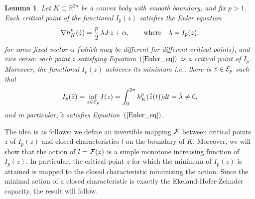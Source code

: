 \documentclass[12pt]{article}
\newtheorem{lemma}{Lemma}[section]
\begin{document}
\begin{lemma} \label{tech_lemma}
Let $K \subset {\mathbb R}^{2n}$ be a convex body with smooth boundary, and fix $p>1$. Each critical point of
the functional $I_p(z)$ satisfies the Euler equation
\begin{equation} \label{Euler_eq} \nabla h_K^p ({\dot {z}}) = {\frac
p 2} \,  \lambda J \,  z + \alpha, \qquad {\rm where} ~~~ \lambda =
I_p(z),
\end{equation}
for some fixed vector $\alpha$ (which may be different for different
critical points), and vice versa: each point $z$ satisfying
Equation~$(\ref{Euler_eq})$ is a critical point of $I_p$. Moreover,
the
 functional $I_p(z)$
achieves its minimum i.e., there is $\tilde z \in {\cal E}_p$ such
that \[ I_p(\tilde z) = \inf_{z \in {\cal E}_p} I(z) = \int_0^{2 \pi}
h_K^p( \dot{\tilde z}(t)) dt= \tilde \lambda \neq 0,\] and in
particular, ${\tilde{z}}$ satisfies Equation~$(\ref{Euler_eq})$.
\end{lemma}


 The idea is as
follows: we define an invertible mapping ${\cal F}$ between critical
points $z$ of $I_p(z)$ and  closed characteristics $l$ on the boundary
of $K$. Moreover, we will show that the action of $l = {\cal F}(z)$
is a simple monotone increasing function of $I_p(z)$. In particular,
the critical point $z$ for which the minimum of $I_p(z)$ is attained
is mapped to the closed characteristic minimizing the action. Since
the minimal action of a closed characteristic is exactly the
Ekeland-Hofer-Zehnder capacity, the result will follow.
\end{document}
